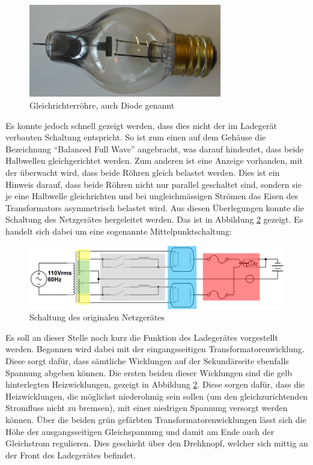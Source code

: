 \begin{figure}[h]
	\centering
		\includegraphics[width=0.75\textwidth]{images/Roehre_Diode.jpg}
	\caption{Gleichrichterröhre, auch Diode genannt}
	\label{fig:Roehre_Diode}
\end{figure}

Es konnte jedoch schnell gezeigt werden, dass dies nicht der im Ladegerät verbauten Schaltung entspricht. So ist zum einen auf dem Gehäuse die Bezeichnung "`Balanced Full Wave"' angebracht, was darauf hindeutet, dass beide Halbwellen gleichgerichtet werden. Zum anderen ist eine Anzeige vorhanden, mit der überwacht wird, dass beide Röhren gleich belastet werden. Dies ist ein Hinweis darauf, dass beide Röhren nicht nur parallel geschaltet sind, sondern sie je eine Halbwelle gleichrichten und bei ungleichmässigen Strömen das Eisen des Transformators asymmetrisch belastet wird. Aus diesen Überlegungen konnte die Schaltung des Netzgerätes hergeleitet werden. Das ist in Abbildung \ref{fig:Schema_Ladegeraet_Alt} gezeigt. Es handelt sich dabei um eine sogenannte Mittelpunktschaltung:

\begin{figure}[h]
	\centering
		\includegraphics[width=1.00\textwidth]{images/Ladegeraet_Alt_2.PNG}
	\caption{Schaltung des originalen Netzgerätes}
	\label{fig:Schema_Ladegeraet_Alt}
\end{figure}

Es soll an dieser Stelle noch kurz die Funktion des Ladegerätes vorgestellt werden. Begonnen wird dabei mit der eingangsseitigen Transformatorenwicklung. Diese sorgt dafür, dass sämtliche Wicklungen auf der Sekundärseite ebenfalls Spannung abgeben können. Die ersten beiden dieser Wicklungen sind die gelb hinterlegten Heizwicklungen, gezeigt in Abbildung \ref{fig:Schema_Ladegeraet_Alt}. Diese sorgen dafür, dass die Heizwicklungen, die möglichst niederohmig sein sollen (um den gleichzurichtenden Stromfluss nicht zu bremsen), mit einer niedrigen Spannung versorgt werden können. Über die beiden grün gefärbten Transformatorenwicklungen lässt sich die Höhe der ausgangsseitigen Gleichspannung und damit am Ende auch der Gleichstrom regulieren. Dies geschieht über den Drehknopf, welcher sich mittig an der Front des Ladegerätes befindet.

